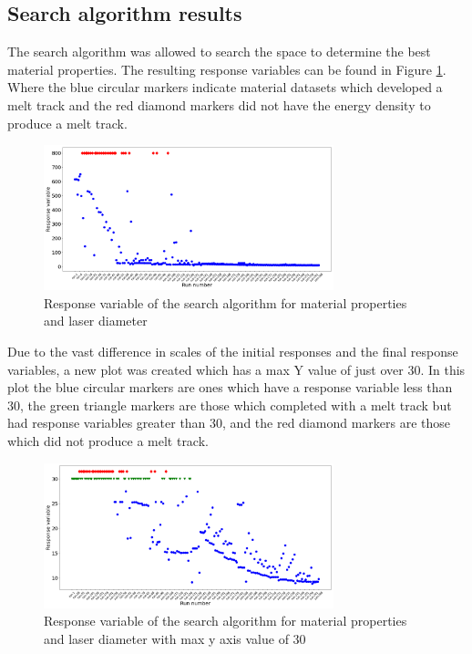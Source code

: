 \documentclass[pdflatex,sn-mathphys]{sn-jnl}
\begin{document}
	\subsection{Search algorithm results} \label{results}

	The search algorithm was allowed to search the space to determine the best material properties.  The resulting response variables can be found in Figure \ref{fig:response_complete}.  Where the blue circular markers indicate material datasets which developed a melt track and the red diamond markers did not have the energy density to produce a melt track.
	\begin{figure}[!htb]
		\centering
		\includegraphics[width=0.75\textwidth]{response_complete}
		\caption{Response variable of the search algorithm for material properties and laser diameter}
		\label{fig:response_complete}
	\end{figure}
	Due to the vast difference in scales of the initial responses and the final response variables, a new plot was created which has a max Y value of just over 30.  In this plot the blue circular markers are ones which have a response variable less than 30, the green triangle markers are those which completed with a melt track but had response variables greater than 30, and the red diamond markers are those which did not produce a melt track.
	\begin{figure}[!htb]
		\centering
		\includegraphics[width=0.75\textwidth]{response_zoomed}
		\caption{Response variable of the search algorithm for material properties and laser diameter with max y axis value of 30}
		\label{fig:response_zoomed}
	\end{figure}
\end{document}
